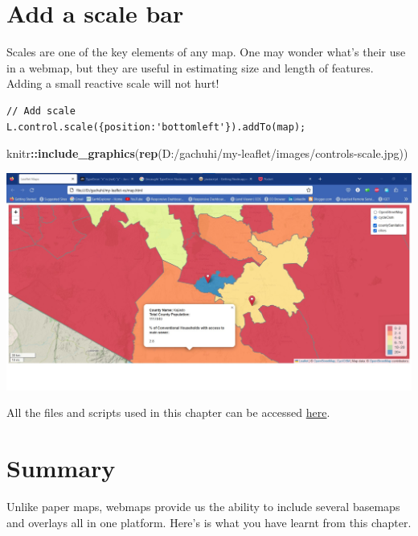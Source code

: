 \documentclass[
]{book}
\newenvironment{Shaded}{\begin{snugshade}}{\end{snugshade}}
\newcommand{\FunctionTok}[1]{\textcolor[rgb]{0.13,0.29,0.53}{\textbf{#1}}}
\newcommand{\NormalTok}[1]{#1}
\newcommand{\SpecialCharTok}[1]{\textcolor[rgb]{0.81,0.36,0.00}{\textbf{#1}}}
\newcommand{\StringTok}[1]{\textcolor[rgb]{0.31,0.60,0.02}{#1}}
\begin{document}
\hypertarget{add-a-scale-bar}{%
\section{Add a scale bar}\label{add-a-scale-bar}}

Scales are one of the key elements of any map. One may wonder what's their use in a webmap, but they are useful in estimating size and length of features. Adding a small reactive scale will not hurt!

\begin{verbatim}
// Add scale
L.control.scale({position:'bottomleft'}).addTo(map);
\end{verbatim}

\begin{Shaded}
\begin{Highlighting}[]
\NormalTok{knitr}\SpecialCharTok{::}\FunctionTok{include\_graphics}\NormalTok{(}\FunctionTok{rep}\NormalTok{(}\StringTok{\textquotesingle{}D:/gachuhi/my{-}leaflet/images/controls{-}scale.jpg\textquotesingle{}}\NormalTok{))}
\end{Highlighting}
\end{Shaded}

\includegraphics{../images/controls-scale.jpg}

All the files and scripts used in this chapter can be accessed \href{https://github.com/sammigachuhi/my-leaflet-project/tree/main/my-leaflet-code/chapter-8-layer_groups_and_controls}{here}.

\hypertarget{summary-7}{%
\section{Summary}\label{summary-7}}

Unlike paper maps, webmaps provide us the ability to include several basemaps and overlays all in one platform. Here's is what you have learnt from this chapter.
\end{document}
